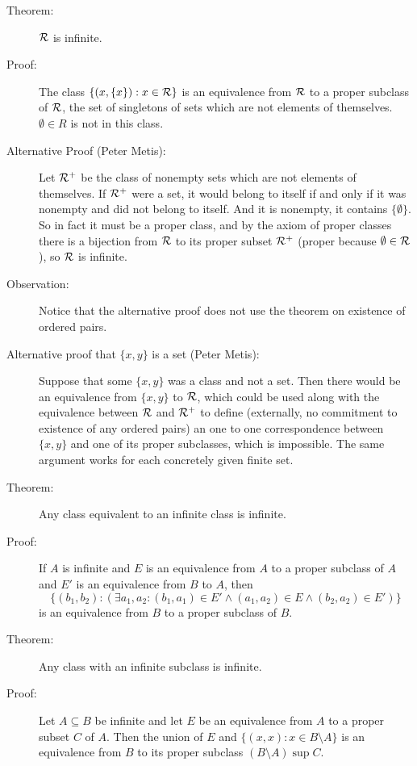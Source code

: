 \documentclass[12pt]{article}
\begin{document}
\begin{description}

\item[Theorem:]  $\cal R$ is infinite.

\item[Proof:]  The class $\{(x,\{x\}): x \in \cal R\}$ is an equivalence from $\cal R$ to a proper subclass of $\cal R$, the set of singletons of sets which are not elements of themselves.
$\emptyset \in R$ is not in this class.

\item[Alternative Proof (Peter Metis):]  Let $\cal R^+$ be the class of nonempty sets which are not elements of themselves.  If $\cal R^+$ were a set, it would belong to itself if and only if
it was nonempty and did not belong to itself.  And it is nonempty, it contains $\{\emptyset\}$.  So in fact it must be a proper class, and by the axiom of proper classes there is a bijection
from $\cal R$ to its proper subset $\cal R^+$ (proper because $\emptyset \in \cal R$), so $\cal R$ is infinite.

\item[Observation:]  Notice that the alternative proof does not use the theorem on existence of ordered pairs.

\item[Alternative proof that $\{x,y\}$ is a set (Peter Metis):]  Suppose that some $\{x,y\}$ was a class and not a set.  Then there would be an equivalence from $\{x,y\}$ to $\cal R$, which could be used along with the equivalence between $\cal R$ and $\cal R^+$ to define (externally, no commitment to existence of any ordered pairs) an one to one correspondence between $\{x,y\}$ and one of its proper subclasses, which is impossible.  The same argument works for each concretely given finite set.

\item[Theorem:]  Any class equivalent to an infinite class is infinite.

\item[Proof:]  If $A$ is infinite and $E$ is an equivalence from $A$ to a proper subclass of $A$ and $E'$ is an equivalence from $B$ to $A$,
then $$\{(b_1,b_2): (\exists a_1,a_2:(b_1,a_1) \in E' \wedge (a_1,a_2) \in E \wedge (b_2,a_2) \in E')\}$$ is an equivalence from $B$ to a proper subclass of $B$.

\item[Theorem:]  Any class with an infinite subclass is infinite.

\item[Proof:]  Let $A\subseteq B$ be infinite and let $E$ be an equivalence from $A$ to a proper subset $C$ of $A$.  Then the union of $E$ and $\{(x,x):x \in B \setminus A\}$ is an equivalence from $B$ to its proper subclass $(B \setminus A) \sup C$.


\end{description}
\end{document}

